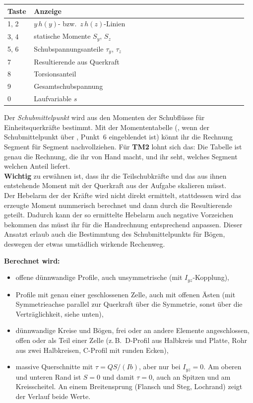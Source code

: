 \begin{longtable}{p{0.10\linewidth}p{0.86\linewidth}}
  \toprule
  \textbf{Taste} & \textbf{Anzeige} \\
  \midrule \endhead
  1, 2 & $y\,h(y)$- bzw.\ $z\,h(z)$-Linien\\
  3, 4 & statische Momente $S_y$, $S_z$ \\
  5, 6 & Schubspannungsanteile $\tau_y$, $\tau_z$ \\
  7 & Resultierende aus Querkraft \\
  8 & Torsionsanteil \\
  9 & Gesamtschubspannung \\
  0 & Laufvariable $s$ \\
  \bottomrule
\end{longtable}

Der \emph{Schubmittelpunkt} wird aus den Momenten der Schubflüsse für Einheitsquerkräfte
bestimmt. Mit der Momententabelle (, wenn der Schubmittelpunkt über ,
Punkt~6 eingeblendet ist) könnt ihr die Rechnung Segment für
Segment nachvollziehen. Für \textbf{TM2} lohnt sich das: Die Tabelle ist genau die Rechnung, die
ihr von Hand macht, und ihr seht, welches Segment welchen Anteil liefert.\\
\textbf{Wichtig} zu erwähnen ist, dass ihr die Teilschubkräfte und das aus ihnen entstehende Moment
mit der Querkraft aus der Aufgabe skalieren müsst. \\
Der Hebelarm der der Kräfte wird nicht direkt ermittelt,
stattdessen wird das erzeugte Moment nummerisch berechnet und dann durch die Resultierende geteilt. Dadurch kann
der so ermittelte Hebelarm auch negative Vorzeichen bekommen das müsst ihr für die Handrechnung entsprechend anpassen.
Dieser Ansatzt erlaub auch die Bestimmtung des Schubmittelpunkts für Bögen, deswegen der etwas
umstädlich wirkende Rechenweg.

\textbf{Berechnet wird:}

\begin{itemize}
  \item offene dünnwandige Profile, auch unsymmetrische (mit $I_{yz}$-Kopplung),
  \item Profile mit genau einer geschlossenen Zelle, auch mit offenen Ästen (mit Symmetrieachse
        parallel zur Querkraft über die Symmetrie, sonst über die Verträglichkeit, siehe unten),
  \item dünnwandige Kreise und Bögen, frei oder an andere Elemente angeschlossen, offen oder als
        Teil einer Zelle (z.\,B.\ D-Profil aus Halbkreis und Platte, Rohr aus zwei Halbkreisen,
        C-Profil mit runden Ecken),
  \item massive Querschnitte mit $\tau = QS/(Ib)$, aber nur bei $I_{yz} = 0$. Am oberen und
        unteren Rand ist $S = 0$ und damit $\tau = 0$, auch an Spitzen und am Kreisscheitel. An
        einem Breitensprung (Flansch und Steg, Lochrand) zeigt der Verlauf beide Werte.
\end{itemize}

